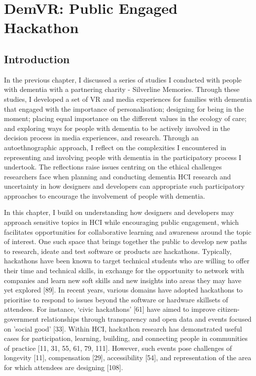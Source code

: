 \chapter{DemVR: Public Engaged Hackathon}
\label{DemVR}

\section{Introduction}
\label{sec:DemVRIntroduction}
In the previous chapter, I discussed a series of studies I conducted with people with dementia with a partnering charity - Silverline Memories. Through these studies, I developed a set of VR and media experiences for families with dementia that engaged with the importance of personalisation; designing for being in the moment; placing equal importance on the different values in the ecology of care; and exploring ways for people with dementia to be actively involved in the decision process in media experiences, and research. Through an autoethnographic approach, I reflect on the complexities I encountered in representing and involving people with dementia in the participatory process I undertook. The reflections raise issues centring on the ethical challenges researchers face when planning and conducting dementia HCI research and uncertainty in how designers and developers can appropriate such participatory approaches to encourage the involvement of people with dementia.

In this chapter, I build on understanding how designers and developers may approach sensitive topics in HCI while encouraging public engagement, which facilitates opportunities for collaborative learning and awareness around the topic of interest. One such space that brings together the public to develop new paths to research, ideate and test software or products are hackathons. Typically, hackathons have been known to target technical students who are willing to offer their time and technical skills, in exchange for the opportunity to network with companies and learn new soft skills and new insights into areas they may have yet explored [89]. In recent years, various domains have adopted hackathons to prioritise to respond to issues beyond the software or hardware skillsets of attendees. For instance, ‘civic hackathons’ [61] have aimed to improve citizen-government relationships through transparency and open data and events focused on 'social good' [33]. Within HCI, hackathon research has demonstrated useful cases for participation, learning, building, and connecting people in communities of practice [11, 31, 55, 61, 79, 111]. However, such events pose challenges of longevity [11], compensation [29], accessibility [54], and representation of the area for which attendees are designing [108]. 

